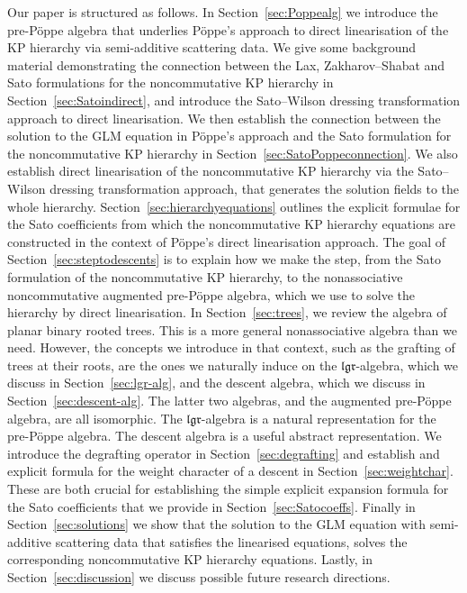 \documentclass[5p,twocolumn]{elsarticle}
\newcommand*{\el}{\mathfrak l}
\newcommand*{\gl}{\mathfrak g}
\newcommand*{\rl}{\mathfrak r}
\begin{document}
Our paper is structured as follows. 
In Section~\ref{sec:Poppealg} we introduce the pre-P\"oppe algebra that underlies P\"oppe's approach to direct linearisation of the KP hierarchy via semi-additive scattering data.
We give some background material demonstrating the connection between the Lax, Zakharov--Shabat and Sato formulations for the noncommutative KP hierarchy in Section~\ref{sec:Satoindirect},
and introduce the Sato--Wilson dressing transformation approach to direct linearisation.
We then establish the connection between the solution to the GLM equation in P\"oppe's approach and the Sato formulation for the noncommutative KP hierarchy in Section~\ref{sec:SatoPoppeconnection}.
We also establish direct linearisation of the noncommutative KP hierarchy via the Sato--Wilson dressing transformation approach, that generates the solution fields to the whole hierarchy.
Section~\ref{sec:hierarchyequations} outlines the explicit formulae for the Sato coefficients from which the noncommutative KP hierarchy equations are constructed in the context
of P\"oppe's direct linearisation approach.
The goal of Section~\ref{sec:steptodescents} is to explain how we make the step, from the Sato formulation of the noncommutative KP hierarchy,
to the nonassociative noncommutative augmented pre-P\"oppe algebra, which we use to solve the hierarchy by direct linearisation. 
In Section~\ref{sec:trees}, we review the algebra of planar binary rooted trees. This is a more general nonassociative algebra than we need.
However, the concepts we introduce in that context, such as the grafting of trees at their roots, are the ones we naturally induce on the  
$\el\gl\rl$-algebra, which we discuss in Section~\ref{sec:lgr-alg}, and the descent algebra, which we discuss in Section~\ref{sec:descent-alg}.
The latter two algebras, and the augmented pre-P\"oppe algebra, are all isomorphic.
The $\el\gl\rl$-algebra is a natural representation for the pre-P\"oppe algebra. The descent algebra is a useful abstract representation.
We introduce the degrafting operator in Section~\ref{sec:degrafting} and establish and explicit formula for the weight character of a descent in Section~\ref{sec:weightchar}.
These are both crucial for establishing the simple explicit expansion formula for the Sato coefficients that we provide in Section~\ref{sec:Satocoeffs}.  
Finally in Section~\ref{sec:solutions} we show that the solution to the GLM equation with semi-additive scattering data that satisfies the linearised equations,
solves the corresponding noncommutative KP hierarchy equations.
Lastly, in Section~\ref{sec:discussion} we discuss possible future research directions. 
 
\end{document}
